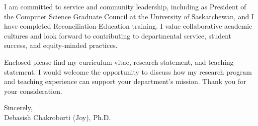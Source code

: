 \documentclass[10pt]{letter}
\begin{document}
I am committed to service and community leadership, including as President of the Computer Science Graduate Council at the University of Saskatchewan, and I have completed Reconciliation Education training. I value collaborative academic cultures and look forward to contributing to departmental service, student success, and equity-minded practices.

Enclosed please find my curriculum vitae, research statement, and teaching statement. I would welcome the opportunity to discuss how my research program and teaching experience can support your department's mission. Thank you for your consideration.

\vspace{0.7em}
\noindent Sincerely,\\[0.9em]
Debasish Chakroborti (Joy), Ph.D.
\end{document}
